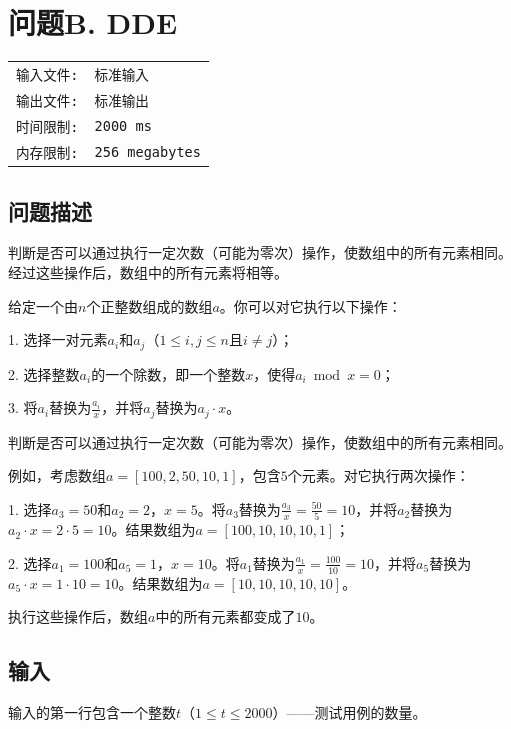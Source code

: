 \documentclass{article}
\begin{document}
\newpage
\section*{\textsf{问题B. }\textrm{DDE}}
\begin{tabular}{ll}
	\fontsize{10pt}{10pt}\texttt{输入文件:} & \fontsize{10pt}{10pt}\texttt{标准输入}          \\
	\fontsize{10pt}{10pt}\texttt{输出文件:} & \fontsize{10pt}{10pt}\texttt{标准输出}          \\
	\fontsize{10pt}{10pt}\texttt{时间限制:} & \fontsize{10pt}{10pt}\texttt{2000 ms}       \\
	\fontsize{10pt}{10pt}\texttt{内存限制:} & \fontsize{10pt}{10pt}\texttt{256 megabytes} \\
\end{tabular}
\subsection*{\textsf{问题描述}}
判断是否可以通过执行一定次数（可能为零次）操作，使数组中的所有元素相同。经过这些操作后，数组中的所有元素将相等。

给定一个由$n$个正整数组成的数组$a$。你可以对它执行以下操作：

1. 选择一对元素$a_i$和$a_j$（$1 \le i, j \le n$且$i \neq j$）；

2. 选择整数$a_i$的一个除数，即一个整数$x$，使得$a_i \bmod x = 0$；

3. 将$a_i$替换为$\frac{a_i}{x}$，并将$a_j$替换为$a_j \cdot x$。

判断是否可以通过执行一定次数（可能为零次）操作，使数组中的所有元素相同。

例如，考虑数组$a = [100, 2, 50, 10, 1]$，包含$5$个元素。对它执行两次操作：

1. 选择$a_3 = 50$和$a_2 = 2$，$x = 5$。将$a_3$替换为$\frac{a_3}{x} = \frac{50}{5} = 10$，并将$a_2$替换为$a_2 \cdot x = 2 \cdot 5 = 10$。结果数组为$a = [100, 10, 10, 10, 1]$；

2. 选择$a_1 = 100$和$a_5 = 1$，$x = 10$。将$a_1$替换为$\frac{a_1}{x} = \frac{100}{10} = 10$，并将$a_5$替换为$a_5 \cdot x = 1 \cdot 10 = 10$。结果数组为$a = [10, 10, 10, 10, 10]$。

执行这些操作后，数组$a$中的所有元素都变成了$10$。
\subsection*{\textsf{输入}}
输入的第一行包含一个整数$t$（$1 \le t \le 2000$）——测试用例的数量。
\end{document}
